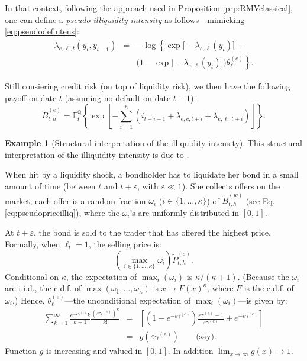 \documentclass[
  12pt,
]{book}
\theoremstyle{definition}
\theoremstyle{definition}
\newtheorem{example}{Example}[chapter]
\theoremstyle{definition}
\theoremstyle{definition}
\theoremstyle{remark}
\begin{document}
In that context, following the approach used in Proposition \ref{prp:RMVclassical}, one can define a \emph{pseudo-illiquidity intensity} as follows---mimicking \eqref{eq:pseudodefintens}:
\begin{eqnarray}
\widetilde{\lambda}_{e,\ell, t} \left( y_t, y_{t-1} \right) &=& - \log \left\{ \exp \Big[ -
\lambda_{e,\ell} \left( y_t\right) \Big] \right. + \label{eq:pseudoilliqintensity}\\
&& \left. \Big( 1 - \exp \Big[ - \lambda_{e,\ell} \left( y_t \right) \Big]
\Big) \theta_\ell^{(e)}  \right\}. \nonumber
\end{eqnarray}

Still consiering credit risk (on top of liquidity risk), we then have the following payoff on date \(t\) (assuming no default on date \(t-1\)):
\begin{equation}
\widetilde{B}^{(e)}_{t,h} = \mathbb{E}^{\mathbb{Q}}_t \left\{ \exp \left[ - \sum_{i=1}^{h} \left( i_{t+i-1} + \widetilde{\lambda}_{e,c, t+i} + \widetilde{\lambda}_{e,\ell, t+i} \right) \right] \right\}.\label{eq:pseudopriceilliq}
\end{equation}

\begin{example}[Structural interpretation of the illiquidity intensity]
\protect\hypertarget{exm:illiqLGD}{}\label{exm:illiqLGD}This structural interpretation of the illiquidity intensity is due to \citet{Ericsson_Renault_2006}.

When hit by a liquidity shock, a bondholder has to liquidate her bond in a small amount of time (between \(t\) and \(t+\varepsilon\), with \(\varepsilon \ll 1\)). She collects offers on the market; each offer is a random fraction \(\omega_{i}\) (\(i\in\{1,\ldots,\kappa\}\)) of \(\widetilde{B}^{(w)}_{t,h}\) (see Eq. \eqref{eq:pseudopriceilliq}), where the \(\omega_{i}\)'s are uniformly distributed in \([0,1]\).

At \(t+\varepsilon\), the bond is sold to the trader that has offered the highest price. Formally, when \(\ell_{t}=1\), the selling price is:
\[
\left(\max_{i\in\{1,\ldots,\kappa\}}\omega_{i}\right)\tilde{P}_{t,h}^{(e)}.
\]
Conditional on \(\kappa\), the expectation of \(\max_{i}(\omega_{i})\) is \(\kappa/(\kappa+1)\). (Because the \(\omega_{i}\) are i.i.d., the c.d.f. of \(\max(\omega_{1},\ldots,\omega_{\kappa})\) is \(x\mapsto F(x)^{\kappa}\), where \(F\) is the c.d.f. of \(\omega_{i}\).)
Hence, \(\theta_\ell^{(e)}\)---the unconditional expectation of \(\max_{i}(\omega_{i})\)---is given by:
\begin{eqnarray*}
\sum_{k=1}^{\infty}\frac{e^{-\varepsilon\gamma^{(e)}}k}{k+1}\frac{\left(\varepsilon\gamma^{(e)}\right)^{k}}{k!} & = & \left[\left(1-e^{-\varepsilon\gamma^{(e)}}\right)\frac{\varepsilon\gamma^{(e)}-1}{\varepsilon\gamma^{(e)}}+e^{-\varepsilon\gamma^{(e)}}\right]\\
& = & g(\varepsilon\gamma^{(e)})\qquad\mbox{(say).}
\end{eqnarray*}
Function \(g\) is increasing and valued in \([0,1]\). In addition \(\lim_{x\rightarrow\infty}g(x)\rightarrow1\).
\end{example}
\end{document}
